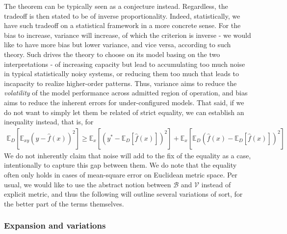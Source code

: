The theorem can be typically seen as a conjecture instead. Regardless, the tradeoff is then stated to be of inverse proportionality. Indeed, statistically, we have such tradeoff on a statistical framework in a more concrete sense. For the bias to increase, variance will increase, of which the criterion is inverse - we would like to have more bias but lower variance, and vice versa, according to such theory. Such drives the theory to choose on its model basing on the two interpretations - of increasing capacity but lead to accumulating too much noise in typical statistically noisy systems, or reducing them too much that leads to incapacity to realize higher-order patterns. Thus, variance aims to reduce the \textit{volatility} of the model performance across admitted region of operation, and bias aims to reduce the inherent errors for under-configured models. That said, if we do not want to simply let them be related of strict equality, we can establish an inequality instead, that is, for 
\begin{equation}
    \begin{split}
        \mathbb{E}_D \left[ \mathbb{E}_{xy} \left( y - \hat{f}(x) \right)^2 \right]
        \geq 
         \mathbb{E}_x \left[ \left( y^* - \mathbb{E}_D[\hat{f}(x)] \right)^2 \right]
        + \mathbb{E}_x \left[ \mathbb{E}_D \left( \hat{f}(x) - \mathbb{E}_D[\hat{f}(x)] \right)^2 \right] 
    \end{split}
\end{equation}
We do not inherently claim that noise will add to the fix of the equality as a case, intentionally to capture this gap between them. We do note that the equality often only holds in cases of mean-square error on Euclidean metric space. Per usual, we would like to use the abstract notion between $\mathcal{B}$ and $\mathcal{V}$ instead of explicit metric, and thus the following will outline several variations of sort, for the better part of the terms themselves. 
\subsubsection{Expansion and variations}

